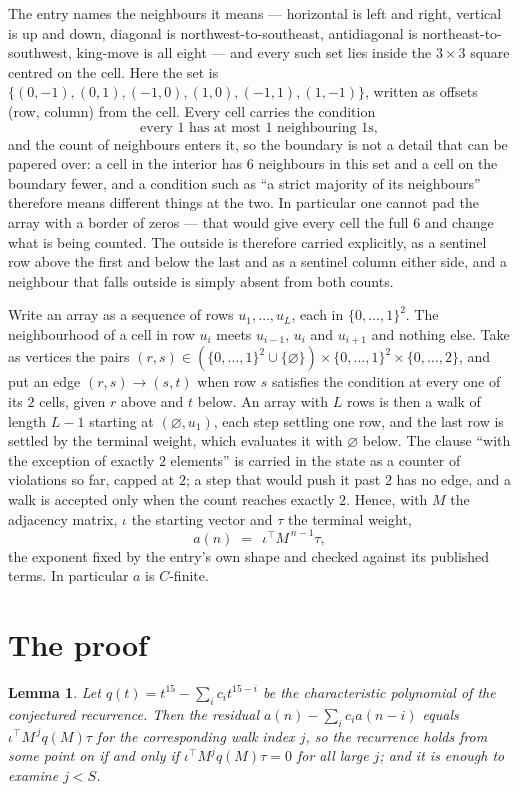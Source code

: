\documentclass[11pt,a4paper]{article}
\theoremstyle{plain}
\newtheorem{lemma}[theorem]{Lemma}
\theoremstyle{definition}
\begin{document}
The entry names the neighbours it means --- horizontal is left and right, vertical is up and
down, diagonal is northwest-to-southeast, antidiagonal is northeast-to-southwest, king-move is
all eight --- and every such set lies inside the $3\times3$ square centred on the cell. Here
the set is $\{(0,-1), (0,1), (-1,0), (1,0), (-1,1), (1,-1)\}$, written as offsets (row, column) from the cell. Every cell carries
the condition
\[
\text{every 1 has at most 1 neighbouring 1s},
\]
and the count of neighbours enters it, so the boundary is not a detail that can be papered
over: a cell in the interior has $6$ neighbours in this set and a cell on the boundary
fewer, and a condition such as ``a strict majority of its neighbours'' therefore means
different things at the two. In particular one cannot pad the array with a border of zeros ---
that would give every cell the full $6$ and change what is being counted. The outside is
therefore carried
explicitly, as a sentinel row above the first and below the last and as a sentinel column
either side, and a neighbour that falls outside is simply absent from both counts.

Write an array as a sequence of rows $u_1,\dots,u_L$, each in
$\{0,\dots,1\}^{2}$. The neighbourhood of a cell in row $u_i$ meets $u_{i-1}$,
$u_i$ and $u_{i+1}$ and nothing else. Take as vertices the pairs
$(r,s)\in(\{0,\dots,1\}^{2}\cup\{\varnothing\})\times\{0,\dots,1\}^{2} \times \{0,\dots,2\}$,
and put an edge $(r,s)\to(s,t)$ when row $s$ satisfies the condition at every one of its
$2$ cells, given $r$ above and $t$ below. An array with $L$ rows is then a walk of length
$L-1$ starting at $(\varnothing,u_1)$, each step settling one row, and the last row is
settled by the terminal weight, which evaluates it with $\varnothing$ below. The clause ``with the exception of exactly $2$ elements'' is carried in
the state as a counter of violations so far, capped at $2$; a step that would push it past
$2$ has no edge, and a walk is accepted only when the count reaches exactly $2$. Hence,
with $M$ the adjacency matrix, $\iota$ the starting vector and $\tau$ the terminal weight,
\[
a(n)\;=\;\,\iota^{\!\top}M^{\,n-1}\tau ,
\]
the exponent fixed by the entry's own shape and checked against its published terms. In
particular $a$ is $C$-finite.

\section{The proof}

\begin{lemma}\label{lem:crit}
Let $q(t)=t^{15}-\sum_i c_it^{15-i}$ be the characteristic polynomial of the
conjectured recurrence. Then the residual $a(n)-\sum_ic_ia(n-i)$ equals
$\iota^{\!\top}M^{\,j}q(M)\tau$ for the corresponding walk index $j$, so the
recurrence holds from some point on if and only if $\iota^{\!\top}M^{j}q(M)\tau=0$ for all
large $j$; and it is enough to examine $j<S$.
\end{lemma}
\end{document}
